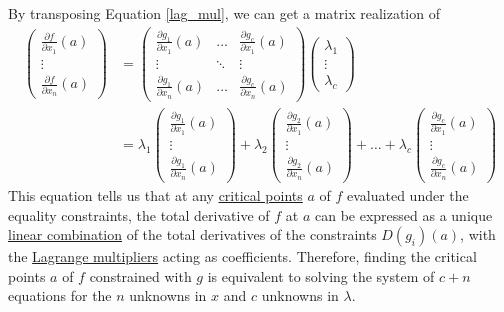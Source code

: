 	By transposing Equation \ref{lag_mul}, we can get a matrix realization of 
	\begin{align}
		\begin{pmatrix}
			\frac{\partial f}{\partial x_1} (a) \\ \vdots\\ \frac{\partial f}{\partial x_n} (a) \end{pmatrix} & = \begin{pmatrix}
			\frac{\partial g_1}{\partial x_1} (a)& \ldots & \frac{\partial g_c}{\partial x_1} (a)\\
			\vdots & \ddots & \vdots \\
			\frac{\partial g_1}{\partial x_n} (a)& \ldots & \frac{\partial g_c}{\partial x_n}(a)
		\end{pmatrix} \begin{pmatrix}
			\lambda_1 \\ \vdots \\ \lambda_c \end{pmatrix} \\
			& = \lambda_1 \begin{pmatrix}
			\frac{\partial g_1}{\partial x_1} (a) \\ \vdots \\ \frac{\partial g_1}{\partial x_n}(a)
			\end{pmatrix} + \lambda_2 \begin{pmatrix}
			\frac{\partial g_2}{\partial x_1} (a) \\ \vdots \\ \frac{\partial g_2}{\partial x_n}(a)
			\end{pmatrix} + \ldots + \lambda_c \begin{pmatrix}
			\frac{\partial g_c}{\partial x_1} (a) \\ \vdots \\ \frac{\partial g_c}{\partial x_n}(a)
		\end{pmatrix}
	\end{align}
	This equation tells us that at any \hyperref[real-def:critical-point]{critical points} $a$ of $f$ evaluated under the equality constraints, the total derivative of $f$ at $a$ can be expressed as a unique \hyperref[lin-def:linear-combination]{linear combination} of the total derivatives of the constraints $D(g_i)(a)$, with the \hyperref[thm:lagrange-multipliers-theorem]{Lagrange multipliers} acting as coefficients. Therefore, finding the critical points $a$ of $f$ constrained with $g$ is equivalent to solving the system of $c + n$ equations for the $n$ unknowns in $x$ and $c$ unknowns in $\lambda$.
